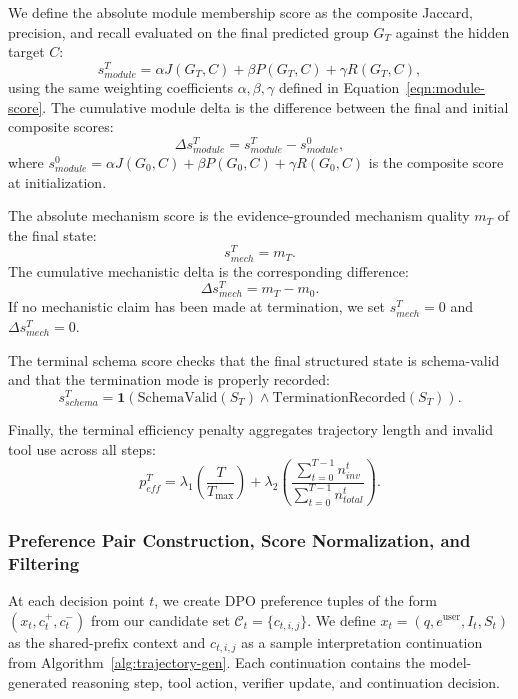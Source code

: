 \documentclass[thesis,letterpaper,12pt]{utthesis}
\begin{document}
We define the absolute module membership score as the composite Jaccard, precision, and recall evaluated on the final predicted group $G_T$ against the hidden target $C$:
\begin{equation}\label{eqn:terminal-module-abs}
    s^{T}_{module} = \alpha J(G_T, C) + \beta P(G_T, C) + \gamma R(G_T, C),
\end{equation}
using the same weighting coefficients $\alpha, \beta, \gamma$ defined in Equation~\ref{eqn:module-score}. The cumulative module delta is the difference between the final and initial composite scores:
\begin{equation}\label{eqn:terminal-module-delta}
    \Delta s^{T}_{module} = s^{T}_{module} - s^{0}_{module},
\end{equation}
where $s^{0}_{module} = \alpha J(G_0, C) + \beta P(G_0, C) + \gamma R(G_0, C)$ is the composite score at initialization.

The absolute mechanism score is the evidence-grounded mechanism quality $m_T$ of the final state:
\begin{equation}\label{eqn:terminal-mech-abs}
    s^{T}_{mech} = m_T.
\end{equation}
The cumulative mechanistic delta is the corresponding difference:
\begin{equation}\label{eqn:terminal-mech-delta}
    \Delta s^{T}_{mech} = m_T - m_0.
\end{equation}
If no mechanistic claim has been made at termination, we set $s^{T}_{mech} = 0$ and $\Delta s^{T}_{mech} = 0$.

The terminal schema score checks that the final structured state is schema-valid and that the termination mode is properly recorded:
\begin{equation}\label{eqn:terminal-schema}
    s^{T}_{schema} = \mathbf{1}(\text{SchemaValid}(S_T) \land \text{TerminationRecorded}(S_T)).
\end{equation}

Finally, the terminal efficiency penalty aggregates trajectory length and invalid tool use across all steps:
\begin{equation}\label{eqn:terminal-eff}
    p^{T}_{eff} = \lambda_1 \left(\frac{T}{T_{\max}}\right) + \lambda_2 \left(\frac{\sum_{t=0}^{T-1} n^{t}_{inv}}{\sum_{t=0}^{T-1} n^{t}_{total}}\right).
\end{equation}

\subsubsection{Preference Pair Construction, Score Normalization, and Filtering}\label{sec:pref-construction}
At each decision point $t$, we create DPO preference tuples of the form $(x_t, c_t^+, c_t^-)$ from our candidate set $\mathcal{C}_t = \{c_{t,i,j}\}$. We define $x_t = (q, e^{\text{user}}, I_t, S_t)$ as the shared-prefix context and $c_{t,i,j}$ as a sample interpretation continuation from Algorithm~\ref{alg:trajectory-gen}. Each continuation contains the model-generated reasoning step, tool action, verifier update, and continuation decision.
\end{document}
